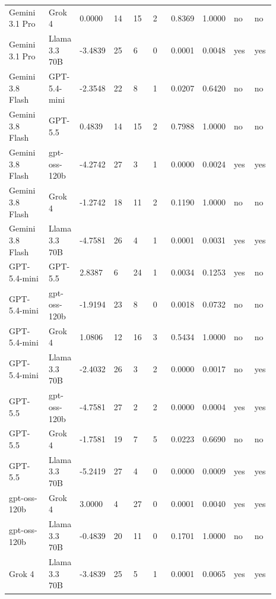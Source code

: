 \begin{landscape}
\begin{longtable}{p{0.162\linewidth}p{0.081\linewidth}p{0.081\linewidth}p{0.081\linewidth}p{0.081\linewidth}p{0.081\linewidth}p{0.081\linewidth}p{0.081\linewidth}p{0.081\linewidth}p{0.081\linewidth}}
Gemini 3.1 Pro & Grok 4 & 0.0000 & 14 & 15 & 2 & 0.8369 & 1.0000 & no & no \\
Gemini 3.1 Pro & Llama 3.3 70B & -3.4839 & 25 & 6 & 0 & 0.0001 & 0.0048 & yes & yes \\
Gemini 3.8 Flash & GPT-5.4-mini & -2.3548 & 22 & 8 & 1 & 0.0207 & 0.6420 & no & no \\
Gemini 3.8 Flash & GPT-5.5 & 0.4839 & 14 & 15 & 2 & 0.7988 & 1.0000 & no & no \\
Gemini 3.8 Flash & gpt-oss-120b & -4.2742 & 27 & 3 & 1 & 0.0000 & 0.0024 & yes & yes \\
Gemini 3.8 Flash & Grok 4 & -1.2742 & 18 & 11 & 2 & 0.1190 & 1.0000 & no & no \\
Gemini 3.8 Flash & Llama 3.3 70B & -4.7581 & 26 & 4 & 1 & 0.0001 & 0.0031 & yes & yes \\
GPT-5.4-mini & GPT-5.5 & 2.8387 & 6 & 24 & 1 & 0.0034 & 0.1253 & yes & no \\
GPT-5.4-mini & gpt-oss-120b & -1.9194 & 23 & 8 & 0 & 0.0018 & 0.0732 & no & no \\
GPT-5.4-mini & Grok 4 & 1.0806 & 12 & 16 & 3 & 0.5434 & 1.0000 & no & no \\
GPT-5.4-mini & Llama 3.3 70B & -2.4032 & 26 & 3 & 2 & 0.0000 & 0.0017 & no & yes \\
GPT-5.5 & gpt-oss-120b & -4.7581 & 27 & 2 & 2 & 0.0000 & 0.0004 & yes & yes \\
GPT-5.5 & Grok 4 & -1.7581 & 19 & 7 & 5 & 0.0223 & 0.6690 & no & no \\
GPT-5.5 & Llama 3.3 70B & -5.2419 & 27 & 4 & 0 & 0.0000 & 0.0009 & yes & yes \\
gpt-oss-120b & Grok 4 & 3.0000 & 4 & 27 & 0 & 0.0001 & 0.0040 & yes & yes \\
gpt-oss-120b & Llama 3.3 70B & -0.4839 & 20 & 11 & 0 & 0.1701 & 1.0000 & no & no \\
Grok 4 & Llama 3.3 70B & -3.4839 & 25 & 5 & 1 & 0.0001 & 0.0065 & yes & yes \\
\bottomrule
\end{longtable}
\normalsize
\end{landscape}
